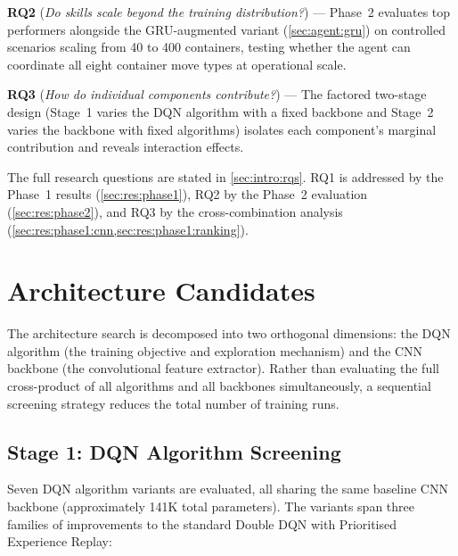 \textbf{RQ2} (\emph{Do skills scale beyond the training distribution?}) --- Phase~2 evaluates top performers alongside the GRU-augmented variant (\cref{sec:agent:gru}) on controlled scenarios scaling from 40 to 400 containers, testing whether the agent can coordinate all eight container move types at operational scale.

\textbf{RQ3} (\emph{How do individual components contribute?}) --- The factored two-stage design (Stage~1 varies the DQN algorithm with a fixed backbone and Stage~2 varies the backbone with fixed algorithms) isolates each component's marginal contribution and reveals interaction effects.

The full research questions are stated in \cref{sec:intro:rqs}. RQ1 is addressed by the Phase~1 results (\cref{sec:res:phase1}), RQ2 by the Phase~2 evaluation (\cref{sec:res:phase2}), and RQ3 by the cross-combination analysis (\cref{sec:res:phase1:cnn,sec:res:phase1:ranking}).

\section{Architecture Candidates}
\label{sec:exp:architectures}

The architecture search is decomposed into two orthogonal dimensions: the DQN algorithm (the training objective and exploration mechanism) and the CNN backbone (the convolutional feature extractor). Rather than evaluating the full cross-product of all algorithms and all backbones simultaneously, a sequential screening strategy reduces the total number of training runs.

\subsection{Stage 1: DQN Algorithm Screening}
\label{sec:exp:architectures:dqn}

Seven DQN algorithm variants are evaluated, all sharing the same baseline CNN backbone (approximately 141K total parameters). The variants span three families of improvements to the standard Double DQN with Prioritised Experience Replay:


